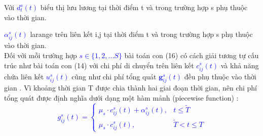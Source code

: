 \documentclass[a4paper]{article}
\begin{document}
Với \textcolor{blue}{$d_{t}^s(t)$} biểu thị lưu lương tại thời điểm t và trong trường hợp s phụ thuộc vào thời gian.

\textcolor{blue}{$\alpha_{ij}^s(t)$}  larange trên liên kết i,j tại thời điểm t và trong trường hợp s phụ thuộc vào thời gian.\\

Đối với mỗi trường hợp \textcolor{blue}{$s\in\{{1,2,...S}\}$} bài toán con (16) có cách giải tương tự cấu trúc như bài toán con (14) với chi phí di chuyển trên liên kết \textcolor{blue}{$c_{ij}^s(t)$} và khả năng chứa liên kết \textcolor{blue}{${u_{ij}^s(t)}$} cũng như chi phí tổng quát \textcolor{blue}{$\mathbf{g}_{ij}^s(t)$} đều phụ thuộc vào thời gian . Vì khoảng thời gian T được chia thành hai giai đoạn thời gian, nên chi phí tổng quát được định nghĩa dưới dạng một hàm mảnh (piecewise  function) : \\
\textcolor{blue}{$$
g_{i j}^s(t)= \begin{cases}\mu_s \cdot c_{i j}^s(t)+\alpha_{i j}^s(t), & t \leqslant \widetilde{T} \\ \mu_s \cdot c_{i j}^s(t), & \widetilde{T}<t \leqslant T\end{cases}
$$}
\end{document}
